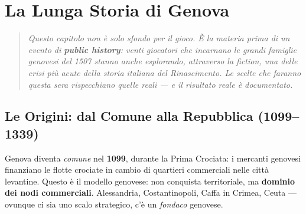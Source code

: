 %

\chapter{La Lunga Storia di Genova}
\label{ch:storia-espansa}

\begin{quote}
\itshape
Questo capitolo non è solo sfondo per il gioco. È la materia prima di un
evento di \textbf{public history}: venti giocatori che incarnano le grandi
famiglie genovesi del 1507 stanno anche esplorando, attraverso la fiction,
una delle crisi più acute della storia italiana del Rinascimento.
Le scelte che faranno questa sera rispecchiano quelle reali — e il
risultato reale è documentato.
\end{quote}

\section{Le Origini: dal Comune alla Repubblica (1099–1339)}
\label{sec:origini}


Genova diventa \textit{comune} nel \textbf{1099}, durante la Prima Crociata:
i mercanti genovesi finanziano le flotte crociate in cambio di quartieri
commerciali nelle città levantine. Questo è il modello genovese: non
conquista territoriale, ma \textbf{dominio dei nodi commerciali}.
Alessandria, Costantinopoli, Caffa in Crimea, Ceuta — ovunque ci sia uno
scalo strategico, c'è un \textit{fondaco} genovese.

